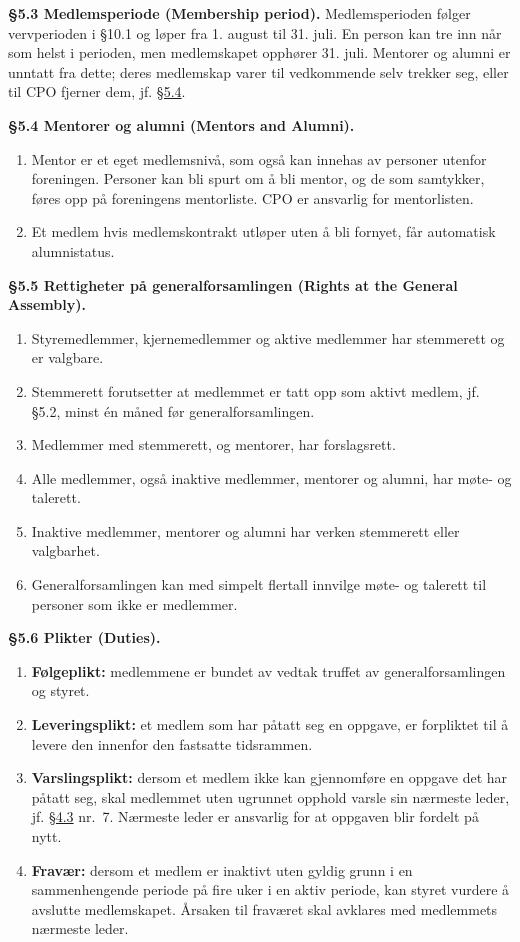 \documentclass{../../../Common/Latex/Templates/rapport}
\begin{document}
\textbf{\S 5.3 Medlemsperiode (Membership period).}\label{bylaw:5.3} Medlemsperioden følger vervperioden i \S10.1 og løper fra 1. august til 31. juli. En person kan tre inn når som helst i perioden, men medlemskapet opphører 31. juli. Mentorer og alumni er unntatt fra dette; deres medlemskap varer til vedkommende selv trekker seg, eller til CPO fjerner dem, jf. \hyperref[bylaw:5.4]{\S 5.4}.

\textbf{\S 5.4 Mentorer og alumni (Mentors and Alumni).}\label{bylaw:5.4}
\begin{enumerate}
  \item Mentor er et eget medlemsnivå, som også kan innehas av personer utenfor foreningen. Personer kan bli spurt om å bli mentor, og de som samtykker, føres opp på foreningens mentorliste. CPO er ansvarlig for mentorlisten.
  \item Et medlem hvis medlemskontrakt utløper uten å bli fornyet, får automatisk alumnistatus.
\end{enumerate}

\textbf{\S 5.5 Rettigheter på generalforsamlingen (Rights at the General Assembly).}\label{bylaw:5.5}
\begin{enumerate}
  \item Styremedlemmer, kjernemedlemmer og aktive medlemmer har stemmerett og er valgbare.
  \item Stemmerett forutsetter at medlemmet er tatt opp som aktivt medlem, jf. \S5.2, minst én måned før generalforsamlingen.
  \item Medlemmer med stemmerett, og mentorer, har forslagsrett.
  \item Alle medlemmer, også inaktive medlemmer, mentorer og alumni, har møte- og talerett.
  \item Inaktive medlemmer, mentorer og alumni har verken stemmerett eller valgbarhet.
  \item Generalforsamlingen kan med simpelt flertall innvilge møte- og talerett til personer som ikke er medlemmer.
\end{enumerate}

\textbf{\S 5.6 Plikter (Duties).}\label{bylaw:5.6}
\begin{enumerate}
  \item \textbf{Følgeplikt:} medlemmene er bundet av vedtak truffet av generalforsamlingen og styret.
  \item \textbf{Leveringsplikt:} et medlem som har påtatt seg en oppgave, er forpliktet til å levere den innenfor den fastsatte tidsrammen.
  \item \textbf{Varslingsplikt:} dersom et medlem ikke kan gjennomføre en oppgave det har påtatt seg, skal medlemmet uten ugrunnet opphold varsle sin nærmeste leder, jf. \hyperref[bylaw:4.3]{\S 4.3} nr.\ 7. Nærmeste leder er ansvarlig for at oppgaven blir fordelt på nytt.
  \item \textbf{Fravær:} dersom et medlem er inaktivt uten gyldig grunn i en sammenhengende periode på fire uker i en aktiv periode, kan styret vurdere å avslutte medlemskapet. Årsaken til fraværet skal avklares med medlemmets nærmeste leder.
\end{enumerate}
\end{document}
